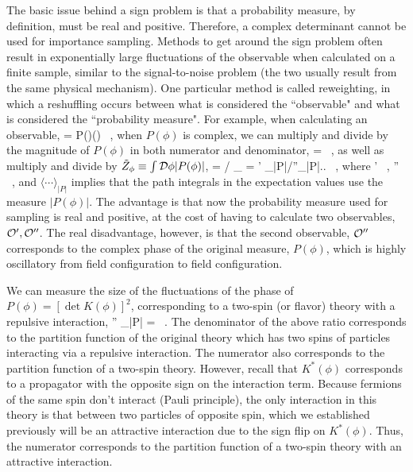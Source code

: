 The basic issue behind a sign problem is that a probability measure, by definition, must be real and positive. Therefore, a complex determinant cannot be used for importance sampling. Methods to get around the sign problem often result in exponentially large fluctuations of the observable when calculated on a finite sample, similar to the signal-to-noise problem (the two usually result from the same physical mechanism). One particular method is called reweighting, in which a reshuffling occurs between what is considered the ``observable" and what is considered the ``probability measure". For example, when calculating an observable,
\beq
\langle \calO \rangle = \int \calD\phi P(\phi)\calO(\phi) \ ,
\eeq
when $P(\phi)$ is complex, we can multiply and divide by the magnitude of $P(\phi)$ in both numerator and denominator,
\beq
\langle \calO \rangle =  \ ,
\eeq
as well as multiply and divide by $\tilde{Z}_{\phi} \equiv \int {\mathcal{ D}} \phi |P(\phi)|$,
\beq
\label{eq:reweight}
\langle \calO \rangle = \left/ {_{\phi}} = \langle \calO' \rangle_{|P|}\left/\langle \calO''\rangle_{|P|}\right.\right. \ ,
\eeq
where
\beq
\calO' \equiv {} \ , \qquad \calO'' \equiv {} \ ,
\eeq
and $\langle \cdots \rangle_{|P|}$ implies that the path integrals in the expectation values use the measure $|P(\phi)|$. The advantage is that now the probability measure used for sampling is real and positive, at the cost of having to calculate two observables, ${\mathcal{ O}}', {\mathcal{ O}}''$. The real disadvantage, however, is that the second observable, ${\mathcal{ O}}''$ corresponds to the complex phase of the original measure, $P(\phi)$, which is highly oscillatory from field configuration to field configuration. 

We can measure the size of the fluctuations of the phase of $P(\phi)= \left[\det K(\phi)\right]^2$, corresponding to a two-spin (or flavor) theory with a repulsive interaction,
\beq
\langle \calO'' \rangle_{|P|} =  \ .
\eeq
The denominator of the above ratio corresponds to the partition function of the original theory which has two spins of particles interacting via a repulsive interaction. The numerator also corresponds to the partition function of a two-spin theory. However, recall that $K^*(\phi)$ corresponds to a propagator with the opposite sign on the interaction term. Because fermions of the same spin don't interact (Pauli principle), the only interaction in this theory is that between two particles of opposite spin, which we established previously will be an attractive interaction due to the sign flip on $K^*(\phi)$. Thus, the numerator corresponds to the partition function of a two-spin theory with an attractive interaction. 

